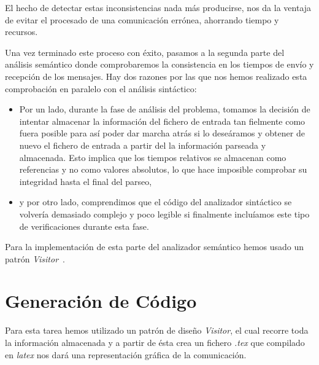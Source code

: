 El hecho de detectar estas inconsistencias nada más producirse, nos da
la ventaja de evitar el procesado de una comunicación errónea,
ahorrando tiempo y recursos.

Una vez terminado este proceso con éxito, pasamos a la segunda parte
del análisis semántico donde comprobaremos la consistencia en los
tiempos de envío y recepción de los mensajes. Hay dos razones por las
que nos hemos realizado esta comprobación en paralelo con el análisis
sintáctico:
\begin{itemize}
\item Por un lado, durante la fase de análisis del problema, tomamos
  la decisión de intentar almacenar la información del fichero de
  entrada tan fielmente como fuera posible para así poder dar marcha
  atrás si lo deseáramos y obtener de nuevo el fichero de entrada a
  partir del la información parseada y almacenada. Esto implica que
  los tiempos relativos se almacenan como referencias y no como
  valores absolutos, lo que hace imposible comprobar su integridad
  hasta el final del parseo,
\item y por otro lado, comprendimos que el código del analizador
  sintáctico se volvería demasiado complejo y poco legible si
  finalmente incluíamos este tipo de verificaciones durante esta fase.
\end{itemize}

Para la implementación de esta parte del analizador semántico hemos
usado un patrón \textit{Visitor}~\cite{gof}.

\section{Generación de Código}

Para esta tarea hemos utilizado un patrón de diseño \textit{Visitor},
el cual recorre toda la información almacenada y a partir de ésta crea
un fichero \textit{.tex} que compilado en \textit{latex} nos dará una
representación gráfica de la comunicación.


